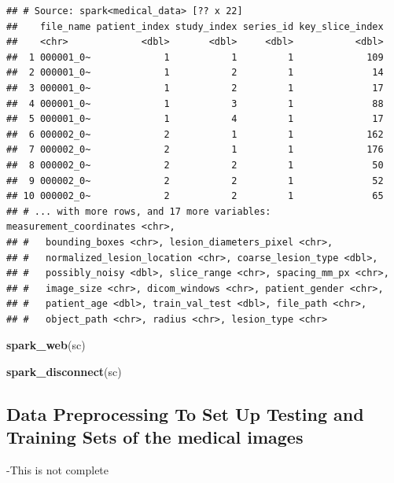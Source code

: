 \documentclass[12pt]{article}
\newenvironment{Shaded}{\begin{snugshade}}{\end{snugshade}}
\newcommand{\KeywordTok}[1]{\textcolor[rgb]{0.13,0.29,0.53}{\textbf{#1}}}
\newcommand{\NormalTok}[1]{#1}
\newcommand{\OperatorTok}[1]{\textcolor[rgb]{0.81,0.36,0.00}{\textbf{#1}}}
\newcommand{\StringTok}[1]{\textcolor[rgb]{0.31,0.60,0.02}{#1}}
\begin{document}
\begin{verbatim}
## # Source: spark<medical_data> [?? x 22]
##    file_name patient_index study_index series_id key_slice_index
##    <chr>             <dbl>       <dbl>     <dbl>           <dbl>
##  1 000001_0~             1           1         1             109
##  2 000001_0~             1           2         1              14
##  3 000001_0~             1           2         1              17
##  4 000001_0~             1           3         1              88
##  5 000001_0~             1           4         1              17
##  6 000002_0~             2           1         1             162
##  7 000002_0~             2           1         1             176
##  8 000002_0~             2           2         1              50
##  9 000002_0~             2           2         1              52
## 10 000002_0~             2           2         1              65
## # ... with more rows, and 17 more variables: measurement_coordinates <chr>,
## #   bounding_boxes <chr>, lesion_diameters_pixel <chr>,
## #   normalized_lesion_location <chr>, coarse_lesion_type <dbl>,
## #   possibly_noisy <dbl>, slice_range <chr>, spacing_mm_px <chr>,
## #   image_size <chr>, dicom_windows <chr>, patient_gender <chr>,
## #   patient_age <dbl>, train_val_test <dbl>, file_path <chr>,
## #   object_path <chr>, radius <chr>, lesion_type <chr>
\end{verbatim}

\begin{Shaded}
\begin{Highlighting}[]
\KeywordTok{spark_web}\NormalTok{(sc)}

\KeywordTok{spark_disconnect}\NormalTok{(sc)}
\end{Highlighting}
\end{Shaded}

\hypertarget{data-preprocessing-to-set-up-testing-and-training-sets-of-the-medical-images}{%
\subsection{Data Preprocessing To Set Up Testing and Training Sets of
the medical
images}\label{data-preprocessing-to-set-up-testing-and-training-sets-of-the-medical-images}}

-This is not complete

\begin{Shaded}
\end{Shaded}
\end{document}
